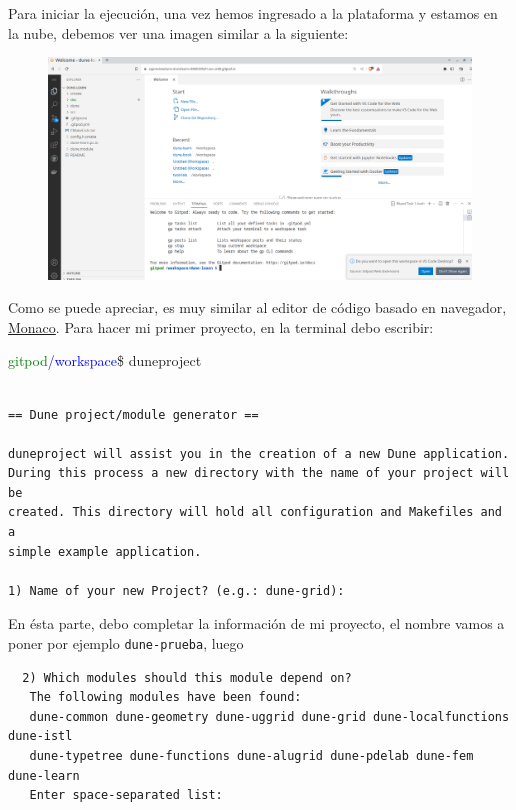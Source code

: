 Para iniciar la ejecución, una vez hemos ingresado a la plataforma y
estamos en la nube, debemos ver una imagen similar a la siguiente:

\begin{figure}[ht!]
	\centering
	\includegraphics[scale=0.3,keepaspectratio]{PantallaIngreso.png}
	\label{fig:ingreso}
\end{figure}

Como se puede apreciar, es muy similar al editor de código basado en
navegador, \href{https://microsoft.github.io/monaco-editor}{Monaco}.
Para hacer mi primer proyecto, en la terminal debo escribir:

\textcolor{green}{gitpod}\textcolor{blue}{/workspace}\$ duneproject
\begin{verbatim}

== Dune project/module generator ==

duneproject will assist you in the creation of a new Dune application.
During this process a new directory with the name of your project will be
created. This directory will hold all configuration and Makefiles and a
simple example application.

1) Name of your new Project? (e.g.: dune-grid): 
\end{verbatim}

En ésta parte, debo completar la información de mi proyecto, el
nombre vamos a poner por ejemplo \verb|dune-prueba|, luego

\begin{verbatim}
  2) Which modules should this module depend on?
   The following modules have been found:
   dune-common dune-geometry dune-uggrid dune-grid dune-localfunctions dune-istl 
   dune-typetree dune-functions dune-alugrid dune-pdelab dune-fem dune-learn 
   Enter space-separated list:
\end{verbatim}

